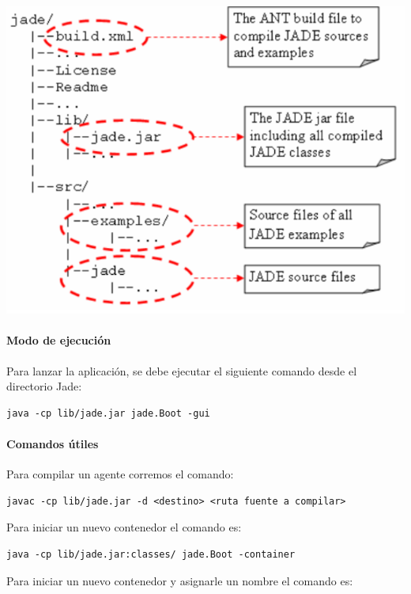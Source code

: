 \documentclass[11pt]{article}
\makeatletter
\def\maxwidth{\ifdim\Gin@nat@width>\linewidth\linewidth
    \else\Gin@nat@width\fi}
\let\Oldincludegraphics\includegraphics
\renewcommand{\includegraphics}[1]{\Oldincludegraphics[width=.8\maxwidth]{#1}}
\makeatother
\begin{document}
\includegraphics{images/jade.png}

\hypertarget{modo-de-ejecuciuxf3n}{%
\paragraph{Modo de ejecución}\label{modo-de-ejecuciuxf3n}}

Para lanzar la aplicación, se debe ejecutar el siguiente comando desde
el directorio Jade:

\begin{verbatim}
java -cp lib/jade.jar jade.Boot -gui
\end{verbatim}

\hypertarget{comandos-uxfatiles}{%
\paragraph{Comandos útiles}\label{comandos-uxfatiles}}

Para compilar un agente corremos el comando:

\begin{verbatim}
javac -cp lib/jade.jar -d <destino> <ruta fuente a compilar>
\end{verbatim}

Para iniciar un nuevo contenedor el comando es:

\begin{verbatim}
java -cp lib/jade.jar:classes/ jade.Boot -container
\end{verbatim}

Para iniciar un nuevo contenedor y asignarle un nombre el comando es:
\end{document}
